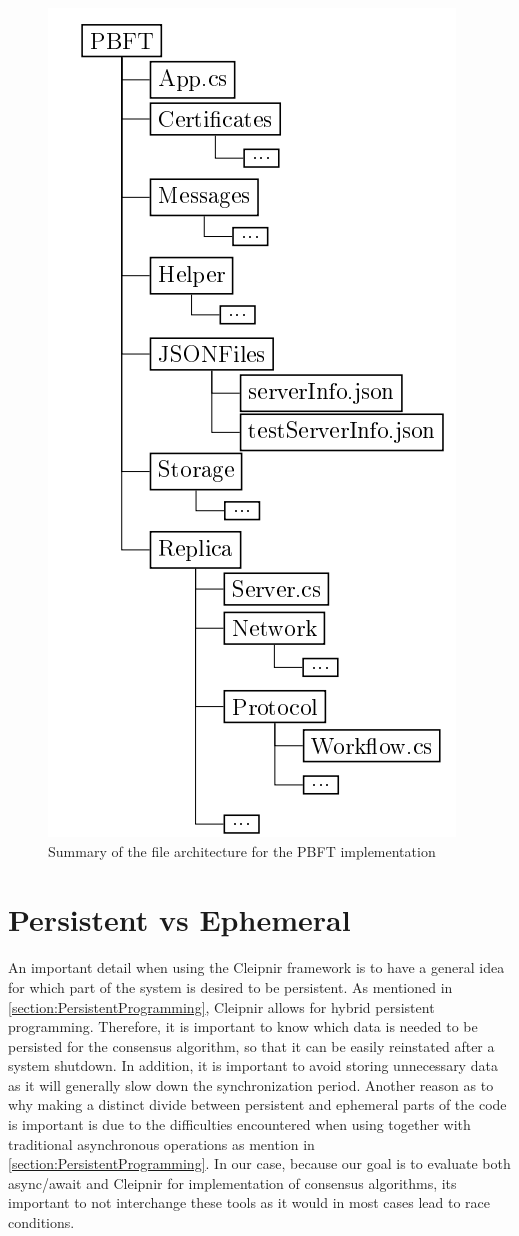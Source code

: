 \begin{figure}[H]
	\includegraphics[width=0.45\linewidth]{figures/filestructtest}
	\caption{Summary of the file architecture for the PBFT implementation}
    \label{fig:filestruct}
\end{figure}

\newpage

\section{Persistent vs Ephemeral}

An important detail when using the Cleipnir framework is to have a general idea for which part of the system is desired to be persistent. As mentioned in \autoref{section:PersistentProgramming}, Cleipnir allows for hybrid persistent programming. Therefore, it is important to know which data is needed to be persisted for the consensus algorithm, so that it can be easily reinstated after a system shutdown. In addition, it is important to avoid storing unnecessary data as it will generally slow down the synchronization period. Another reason as to why making a distinct divide between persistent and ephemeral parts of the code is important is due to the difficulties encountered when using  together with traditional asynchronous operations as mention in \autoref{section:PersistentProgramming}. In our case, because our goal is to evaluate both async/await and Cleipnir for implementation of consensus algorithms, its important to not interchange these tools as it would in most cases lead to race conditions.

